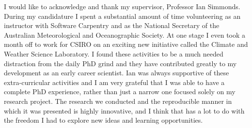 
\begin{acknowledgements}

	I would like to acknowledge and thank my supervisor, Professor Ian Simmonds. During my candidature I spent a substantial amount of time volunteering as an instructor with Software Carpentry and as the National Secretary of the Australian Meteorological and Oceanographic Society. At one stage I even took a month off to work for CSIRO on an exciting new initiative called the Climate and Weather Science Laboratory. I found these activities to be a much needed distraction from the daily PhD grind and they have contributed greatly to my development as an early career scientist. Ian was always supportive of these extra-curricular activities and I am very grateful that I was able to have a complete PhD experience, rather than just a narrow one focused solely on my research project. The research we conducted and the reproducible manner in which it was presented is highly innovative, and I think that has a lot to do with the freedom I had to explore new ideas and learning opportunities.    
	

\end{acknowledgements}
